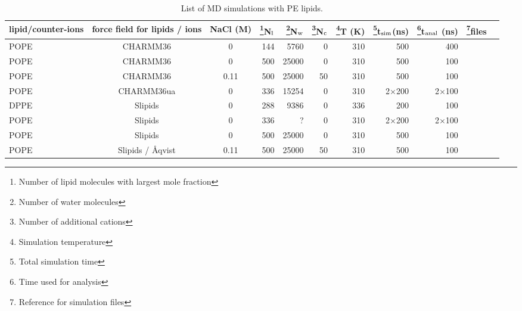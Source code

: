 \documentclass[journal=jpcbfk]{achemso}
\begin{document}
%
\begin{sidewaystable*}[!p]
  \centering
  \caption{List of MD simulations with PE lipids.
  }\label{systemsPE}
  \begin{minipage}[t]{\textwidth}
    \begin{tabular}{l c c r r r r r r c c}
      lipid/counter-ions & force field for lipids / ions  & NaCl (M) & \footnote{Number of lipid molecules with largest mole fraction}N$_{\rm l}$   &  \footnote{Number of water molecules}N$_{\rm w}$   & \footnote{Number of additional cations}N$_{\rm c}$   & \footnote{Simulation temperature}T (K)  & \footnote{Total simulation time}t$_{{\rm sim}}$(ns) & \footnote{Time used for analysis}t$_{{\rm anal}}$ (ns) &   \footnote{Reference for simulation files}files\\
      \hline
      POPE  & CHARMM36 \cite{??}           &0       & 144	& 5760  &0    & 310  & 500          & 400          & \cite{charmm36POPEfiles} \\
      POPE  & CHARMM36 \cite{??}           & 0      & 500       & 25000 & 0   &  310  & 500 & 100 & \cite{POPEcharmm} \\
      POPE  & CHARMM36 \cite{??}           & 0.11   & 500       & 25000 & 50  &  310  & 500 & 100 & \cite{POPEcharmm150mMNaCl} \\
      POPE  & CHARMM36ua \cite{??}         &0       & 336	& 15254 &0    & 310  & 2$\times$200 & 2$\times$100 & \cite{charmm36uaPOPEfiles}  \\
      \hline
      DPPE  & Slipids \cite{jambeck12b}    &0    & 288 	& 9386  &0    & 336  & 200 & 100 & \cite{slipidsDPPEfiles}  \\
      POPE  & Slipids \cite{jambeck12b} &0    & 336	& ?     &0    & 310  & 2$\times$200 &  2$\times$100 & \cite{slipidsPOPEfiles}  \\
      POPE  & Slipids \cite{jambeck12b}            & 0    & 500 & 25000 & 0   &  310  & 500 & 100 & \cite{POPEslipids} \\
      POPE  & Slipids / {\AA}qvist \cite{jambeck12b,aqvist90}  & 0.11 & 500 & 25000 & 50  &  310  & 500 & 100 & \cite{POPEslipids150mMNaCl} \\

\end{tabular}
\end{minipage}
\end{sidewaystable*}
\end{document}
